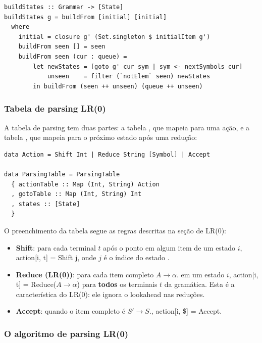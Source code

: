 \begin{verbatim}
buildStates :: Grammar -> [State]
buildStates g = buildFrom [initial] [initial]
  where
    initial = closure g' (Set.singleton $ initialItem g')
    buildFrom seen [] = seen
    buildFrom seen (cur : queue) =
        let newStates = [goto g' cur sym | sym <- nextSymbols cur]
            unseen    = filter (`notElem` seen) newStates
        in buildFrom (seen ++ unseen) (queue ++ unseen)
\end{verbatim}

\subsubsection{Tabela de parsing LR(0)}

A tabela de parsing tem duas partes: a tabela
, que mapeia
 para uma ação, e a
tabela , que mapeia
 para o próximo
estado após uma redução:

\begin{verbatim}
data Action = Shift Int | Reduce String [Symbol] | Accept

data ParsingTable = ParsingTable
  { actionTable :: Map (Int, String) Action
  , gotoTable :: Map (Int, String) Int
  , states :: [State]
  }
\end{verbatim}

O preenchimento da tabela segue as regras descritas na seção de LR(0):

\begin{itemize}
  \item
    \textbf{Shift}: para cada terminal \(t\) após o ponto em algum
    item de um estado \(i\), action[i, t] = Shift j, onde
    \(j\) é o índice do estado
    .
  \item
    \textbf{Reduce (LR(0))}: para cada item completo \(A \to \alpha
    .\) em um estado \(i\), action[i, t] =
    Reduce($A \to \alpha$) para \textbf{todos} os terminais \(t\) da
    gramática. Esta é a característica do LR(0): ele ignora o
    lookahead nas reduções.
  \item
    \textbf{Accept}: quando o item completo é \(S' \to S .\),
    action[i, \$] = Accept.
\end{itemize}

\subsubsection{O algoritmo de parsing LR(0)}

